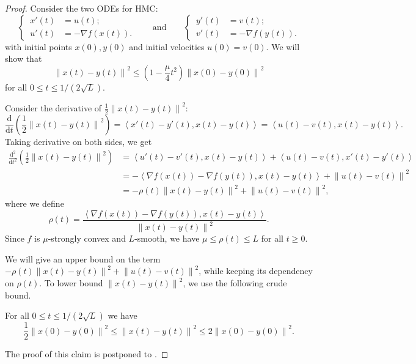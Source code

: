 \documentclass{toc}
\newcommand{\dif}{\mathrm{d}}
\newcommand{\norm}[1]{\left\lVert #1 \right\rVert}
\newcommand{\ip}[2]{\left\langle #1 , #2 \right\rangle}
\newcommand{\grad}{\nabla}
\begin{document}
\begin{proof}%
	Consider the two ODEs for HMC:
	\[
	\left\{\,
	\begin{aligned}
	x'(t) &= u(t);\\
	u'(t) &= -\grad f(x(t)).
	\end{aligned}
	\right.
	\qquad\text{and}\qquad
	\left\{\,
	\begin{aligned}
	y'(t) &= v(t);\\
	v'(t) &= -\grad f(y(t)).
	\end{aligned}
	\right.
	\]
	with initial points $x(0), y(0)$ and initial velocities $u(0) = v(0)$. 
	We will show that
	\[
	\norm{x(t)-y(t)}^2 \leq \left( 1 - \frac{\mu}{4} t^2 \right) \norm{x(0) - y(0)}^2
	\]
	for all $0 \le t \le 1/(2\sqrt{L})$. 
	
	Consider the derivative of $\frac{1}{2} \norm{x(t)-y(t)}^2$:
	\begin{equation}\label{eqn:deri_x-y}
	\frac{\dif}{\dif t} \left( \frac{1}{2} \norm{x(t)-y(t)}^2 \right) = 
	\ip{x'(t)-y'(t)}{x(t)-y(t)} = \ip{u(t)-v(t)}{x(t)-y(t)}.
	\end{equation}
	Taking derivative on both sides, we get
	\begin{align}
	\frac{\dif^2}{\dif t^2} \left( \frac{1}{2} \norm{x(t)-y(t)}^2 \right) 
  &= \ip{u'(t)-v'(t)}{x(t)-y(t)} + \ip{u(t)-v(t)}{x'(t)-y'(t)} \nonumber\\
  &= - \ip{\grad f(x(t)) - \grad f(y(t))}{x(t)-y(t)} + \norm{u(t)-v(t)}^2 \nonumber\\ 
  &= - \rho(t) \norm{x(t)-y(t)}^2 + \norm{u(t)-v(t)}^2, \label{eqn:deri2_x-y}
	\end{align}
where we define
	\[
	\rho(t) = \frac{\ip{\grad f(x(t)) - \grad f(y(t))}{x(t)-y(t)}}{\norm{x(t)-y(t)}^2}.
	\]
	Since $f$ is $\mu$-strongly convex and $L$-smooth, we have $\mu \le \rho(t) \le L$ for all $t\geq 0$.
	
We will %
give an upper bound on  %
the term $- \rho(t)\norm{x(t)-y(t)}^2 + \norm{u(t)-v(t)}^2$, while keeping its dependency on $\rho(t)$. To lower bound $\norm{x(t)-y(t)}^2$, we use the following crude bound.
	\begin{claim}
		\label{claim:crude-bound}
		For all $0 \le t \le 1/(2\sqrt{L})$ we have
		\begin{equation}\label{eqn:crude_bound}
		\frac{1}{2} \norm{x(0) - y(0)}^2 \le \norm{x(t)-y(t)}^2 \le 2 \norm{x(0) - y(0)}^2.
		\end{equation}
	\end{claim}
	\noindent
	The proof of this claim is postponed to . 
	

\end{proof}
\end{document}
